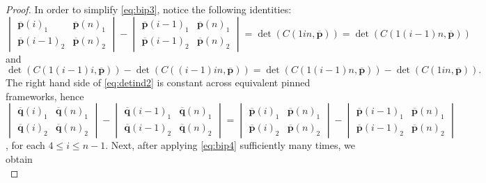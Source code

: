 \documentclass[11pt]{amsart}
\theoremstyle{definition}
\theoremstyle{remark}
\begin{document}
\begin{proof}
    In order to simplify \cref{eq:bip3}, notice the following identities:
    \begin{equation}\label{eq:detind1}
        \begin{vmatrix} \overline{\mathbf{p}}(i)_1 & \overline{\mathbf{p}}(n)_1 \\ \overline{\mathbf{p}}(i-1)_2 & \overline{\mathbf{p}}(n)_2 \end{vmatrix} - \begin{vmatrix} \overline{\mathbf{p}}(i-1)_1 & \overline{\mathbf{p}}(n)_1 \\ \overline{\mathbf{p}}(i-1)_2 & \overline{\mathbf{p}}(n)_2 \end{vmatrix} = \det(C(1in,\overline{\mathbf{p}})) = \det(C(1(i-1)n,\overline{\mathbf{p}}))
    \end{equation}
    and
    \begin{equation}\label{eq:detind2}
        \det(C(1(i-1)i,\overline{\mathbf{p}})) - \det(C((i-1)in,\overline{\mathbf{p}})) = \det(C(1(i-1)n,\overline{\mathbf{p}})) - \det(C(1in,\overline{\mathbf{p}})).
    \end{equation}
    The right hand side of \cref{eq:detind2} is constant across equivalent pinned frameworks, hence
    \begin{equation}\label{eq:bip4}
        \begin{vmatrix} \overline{\mathbf{q}}(i)_1 & \overline{\mathbf{q}}(n)_1 \\ \overline{\mathbf{q}}(i)_2 & \overline{\mathbf{q}}(n)_2 \end{vmatrix} - \begin{vmatrix} \overline{\mathbf{q}}(i-1)_1 & \overline{\mathbf{q}}(n)_1 \\ \overline{\mathbf{q}}(i-1)_2 & \overline{\mathbf{q}}(n)_2 \end{vmatrix} = \begin{vmatrix} \overline{\mathbf{p}}(i)_1 & \overline{\mathbf{p}}(n)_1 \\ \overline{\mathbf{p}}(i)_2 & \overline{\mathbf{p}}(n)_2 \end{vmatrix} - \begin{vmatrix} \overline{\mathbf{p}}(i-1)_1 & \overline{\mathbf{p}}(n)_1 \\ \overline{\mathbf{p}}(i-1)_2 & \overline{\mathbf{p}}(n)_2 \end{vmatrix}
    \end{equation},
    for each $4\leq i\leq n-1$.
    Next, after applying \cref{eq:bip4} sufficiently many times, we obtain
    \begin{equation}

\end{equation}
\end{proof}
\end{document}
